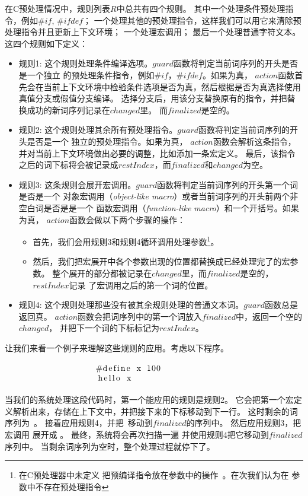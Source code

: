 在C预处理情况中，规则列表$R$中总共有四个规则。
其中一个处理条件预处理指令，例如$\#if$, $\#ifdef$；
一个处理其他的预处理指令，这样我们可以用它来清除预处理指令并且更新上下文环境；
一个处理宏调用；
最后一个处理普通字符文本。
这四个规则如下定义：

\begin{itemize}
\item 规则1: 这个规则处理条件编译选项。$guard$函数将判定当前词序列的开头是否是一个独立
  的预处理条件指令，例如$\#if$，$\#ifdef$。如果为真，
  $action$函数首先会在当前上下文环境中检验条件选项是否为真，然后根据是否为真选择使用
  真值分支或假值分支编译。
  选择分支后，用该分支替换原有的指令，并把替换成功的新词序列记录在$changed$里。
  而$finalized$是空的。
\item 规则2: 这个规则处理其余所有预处理指令。$guard$函数将判定当前词序列的开头是否是一个
  独立的预处理指令。如果为真，
  $action$函数会解析这条指令，并对当前上下文环境做出必要的调整，比如添加一条宏定义。
  最后，该指令之后的词下标将会被记录成$restIndex$，而$finalized$和$changed$为空。
\item 规则3: 这条规则会展开宏调用。$guard$函数将判定当前词序列的开头第一个词是否是一个
  对象宏调用（\emph{object-like macro}）或者当前词序列的开头前两个非空白词是否是是一个
  函数宏调用（\emph{function-like macro}）和一个开括号。如果为真，
  $action$函数会做以下两个步骤的操作：
  \begin{itemize}
  \item 首先，我们会用规则3和规则4循环调用处理参数\footnote{在C预处理器中未定义
    把预编译指令放在参数中的操作~\parencite{CStandard}。在次我们认为在
    参数中不存在预处理指令}。
  \item 然后，我们把宏展开中各个参数出现的位置都替换成已经处理完了的宏参数。
    整个展开的部分都被记录在$changed$里，而$finalized$是空的，$restIndex$记录
    了宏调用之后的第一个词的位置。
  \end{itemize}
\item 规则4: 这个规则处理那些没有被其余规则处理的普通文本词。$guard$函数总是返回真。
  $action$函数会把词序列中的第一个词放入$finalized$中，返回一个空的$changed$，
  并把下一个词的下标标记为$restIndex$。
\end{itemize}

让我们来看一个例子来理解这些规则的应用。考虑以下程序。
\begin{equation}
\begin{minipage}{0.4\columnwidth}
\begin{lstlisting}
#define x 100
hello x
\end{lstlisting}
\end{minipage}
\label{eqn:smallexample}
\end{equation}
当我们的系统处理这段代码时，第一个能应用的规则是规则2。
它会把第一个宏定义解析出来，存储在上下文中，并把接下来的下标移动到下一行。
这时剩余的词序列为~。
接着应用规则4，并把~移动到$finalized$的序列中。
然后应用规则3，把宏调用  展开成 。
最终，系统将会再次扫描一遍  并使用规则4把它移动到$finalized$序列中。
当剩余词序列为空时，整个处理过程就停下了。

